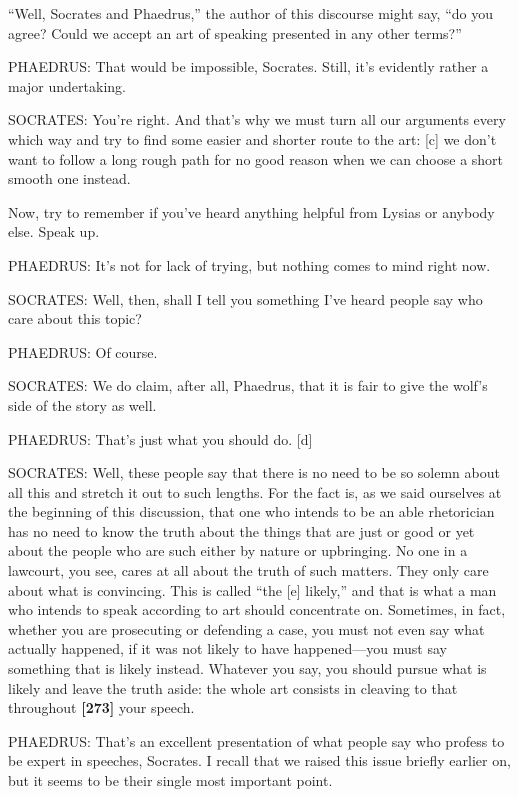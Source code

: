 “Well, Socrates and Phaedrus,” the author of this discourse might say,
“do you agree? Could we accept an art of speaking presented in any other
terms?”

PHAEDRUS: That would be impossible, Socrates. Still, it's evidently
rather a major undertaking.

SOCRATES: You're right. And that's why we must turn all our arguments
every which way and try to find some easier and shorter route to the
art: {[}c{]} we don't want to follow a long rough path for no good
reason when we can choose a short smooth one instead.

Now, try to remember if you've heard anything helpful from Lysias or
anybody else. Speak up.

PHAEDRUS: It's not for lack of trying, but nothing comes to mind right
now.

SOCRATES: Well, then, shall I tell you something I've heard people say
who care about this topic?

PHAEDRUS: Of course.

SOCRATES: We do claim, after all, Phaedrus, that it is fair to give the
wolf's side of the story as well.

PHAEDRUS: That's just what you should do. {[}d{]}

SOCRATES: Well, these people say that there is no need to be so solemn
about all this and stretch it out to such lengths. For the fact is, as
we said ourselves at the beginning of this
discussion, that one
who intends to be an able rhetorician has no need to know the truth
about the things that are just or good or yet about the people who are
such either by nature or upbringing. No one in a lawcourt, you see,
cares at all about the truth of such matters. They only care about what
is convincing. This is called “the {[}e{]} likely,” and that is what a
man who intends to speak according to art should concentrate on.
Sometimes, in fact, whether you are prosecuting or defending a case, you
must not even say what actually happened, if it was not likely to have
happened---you must say something that is likely instead. Whatever you
say, you should pursue what is likely and leave the truth aside: the
whole art consists in cleaving to that throughout {\bf {[}273{]}} your
speech.

PHAEDRUS: That's an excellent presentation of what people say who
profess to be expert in speeches, Socrates. I recall that we raised this
issue briefly earlier on, but it seems to be their single most important
point.

